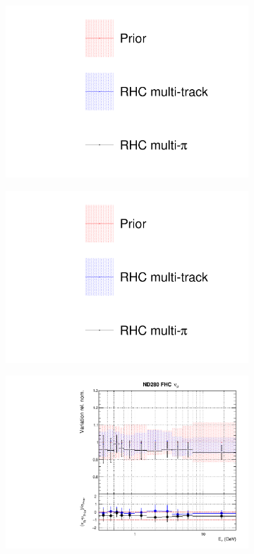 \begin{figure}[t]
\centering
\begin{subfigure}{0.3\textwidth}
  \centering
  \includegraphics[width=1.0\linewidth, trim={5mm  130mm 0mm 10mm}, clip]{figs/rhcmpdat248_leg}	
\end{subfigure}
\begin{subfigure}{0.3\textwidth}
  \centering
  \includegraphics[width=1.0\linewidth, trim={5mm  0mm 0mm 70mm}, clip]{figs/rhcmpdat248_leg}	
\end{subfigure}
\begin{subfigure}{0.45\textwidth}
  \centering
  \includegraphics[width=0.75\linewidth]{figs/rhcmpasmvflux0}

\end{subfigure}
\end{figure}
